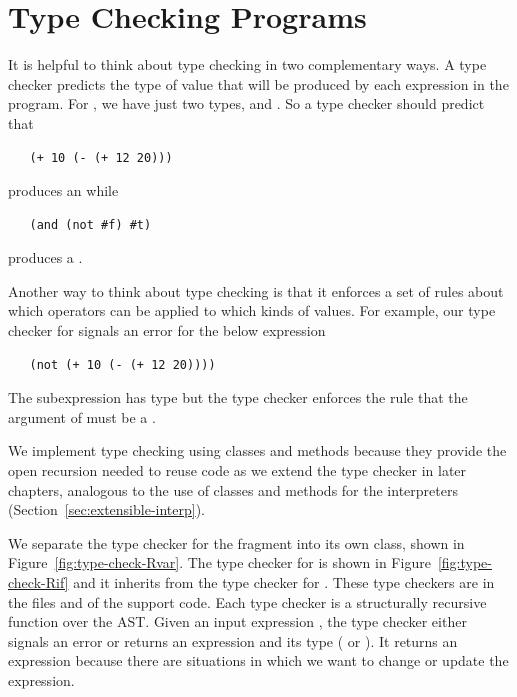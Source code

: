 \documentclass[11pt]{book}
\newcommand{\ocaml}[1]{{\color{blue}{#1}}}
\begin{document}
{\section{Type Checking \LangIf{} Programs}
\label{sec:type-check-Rif}

It is helpful to think about type checking in two complementary
ways. A type checker predicts the type of value that will be produced
by each expression in the program.  For \LangIf{}, we have just two types,
 and . So a type checker should predict that
\begin{lstlisting}
   (+ 10 (- (+ 12 20)))
\end{lstlisting}
produces an  while
\begin{lstlisting}
   (and (not #f) #t)
\end{lstlisting}
produces a .

Another way to think about type checking is that it enforces a set of
rules about which operators can be applied to which kinds of
values. For example, our type checker for \LangIf{} signals an error
for the below expression
\begin{lstlisting}
   (not (+ 10 (- (+ 12 20))))
\end{lstlisting}
The subexpression  has type 
but the type checker enforces the rule that the argument of 
must be a .

We implement type checking using classes and methods because they
provide the open recursion needed to reuse code as we extend the type
checker in later chapters, analogous to the use of classes and methods
for the interpreters (Section~\ref{sec:extensible-interp}).

We separate the type checker for the \LangVar{} fragment into its own
class, shown in Figure~\ref{fig:type-check-Rvar}. The type checker for
\LangIf{} is shown in Figure~\ref{fig:type-check-Rif} and it inherits
from the type checker for \LangVar{}. These type checkers are in the
files  and  of the
support code. \ocaml{A single unified checker is in \code{RIf.ml}.}
%
Each type checker is a structurally recursive function over the AST.
Given an input expression , the type checker either signals an
error or returns an expression and its type ( or
). It returns an expression because there are situations
in which we want to change or update the expression.

}
\end{document}
